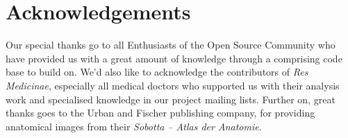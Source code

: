 %
%
%
%
%
%
%

\section{Acknowledgements}
\label{acknowledgements_heading}

Our special thanks go to all Enthusiasts of the Open Source Community who have
provided us with a great amount of knowledge through a comprising code base to
build on. We'd also like to acknowledge the contributors of \emph{Res Medicinae},
especially all medical doctors who supported us with their analysis work
\cite{resmedicinae2001} and specialised knowledge in our project mailing lists.
Further on, great thanks goes to the Urban and Fischer publishing company, for
providing anatomical images from their \emph{Sobotta -- Atlas der Anatomie}.

